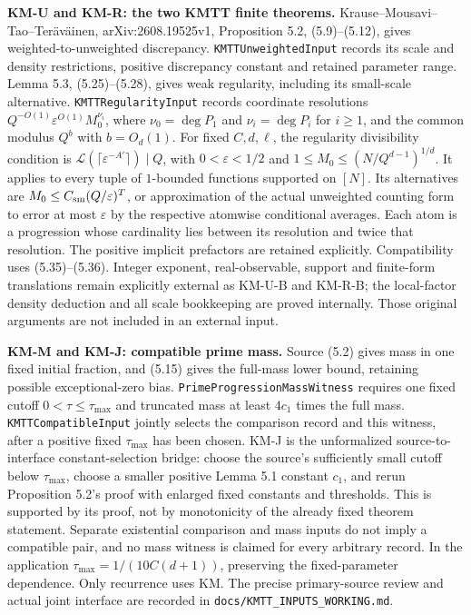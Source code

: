 \textbf{KM-U and KM-R: the two KMTT finite theorems.} Krause--Mousavi--Tao--Ter\"av\"ainen, arXiv:2608.19525v1, Proposition 5.2, (5.9)--(5.12), gives weighted-to-unweighted discrepancy. \texttt{KMTTUnweightedInput} records its scale and density restrictions, positive discrepancy constant and retained parameter range. Lemma 5.3, (5.25)--(5.28), gives weak regularity, including its small-scale alternative. \texttt{KMTTRegularityInput} records coordinate resolutions $Q^{-O(1)}\varepsilon^{O(1)}M_0^{\nu_i}$, where $\nu_0=\deg P_1$ and $\nu_i=\deg P_i$ for $i\geq1$, and the common modulus $Q^b$ with $b=O_d(1)$. For fixed $C,d,\ell$, the regularity divisibility condition is $\mathcal L(\lceil\varepsilon^{-A'}\rceil)\mid Q$, with $0<\varepsilon<1/2$ and $1\leq M_0\leq(N/Q^{d-1})^{1/d}$. It applies to every tuple of $1$-bounded functions supported on $[N]$. Its alternatives are $M_0\leq C_{\rm sm}(Q/\varepsilon)^T$, or approximation of the actual unweighted counting form to error at most $\varepsilon$ by the respective atomwise conditional averages. Each atom is a progression whose cardinality lies between its resolution and twice that resolution. The positive implicit prefactors are retained explicitly. Compatibility uses (5.35)--(5.36). Integer exponent, real-observable, support and finite-form translations remain explicitly external as KM-U-B and KM-R-B; the local-factor density deduction and all scale bookkeeping are proved internally. Those original arguments are not included in an external input.

\textbf{KM-M and KM-J: compatible prime mass.} Source (5.2) gives mass in one fixed initial fraction, and (5.15) gives the full-mass lower bound, retaining possible exceptional-zero bias. \texttt{PrimeProgressionMassWitness} requires one fixed cutoff $0<\tau\leq\tau_{\max}$ and truncated mass at least $4c_1$ times the full mass. \texttt{KMTTCompatibleInput} jointly selects the comparison record and this witness, after a positive fixed $\tau_{\max}$ has been chosen. KM-J is the unformalized source-to-interface constant-selection bridge: choose the source's sufficiently small cutoff below $\tau_{\max}$, choose a smaller positive Lemma 5.1 constant $c_1$, and rerun Proposition 5.2's proof with enlarged fixed constants and thresholds. This is supported by its proof, not by monotonicity of the already fixed theorem statement. Separate existential comparison and mass inputs do not imply a compatible pair, and no mass witness is claimed for every arbitrary record. In the application $\tau_{\max}=1/(10C(d+1))$, preserving the fixed-parameter dependence. Only recurrence uses KM. The precise primary-source review and actual joint interface are recorded in \texttt{docs/KMTT\_INPUTS\_WORKING.md}.

